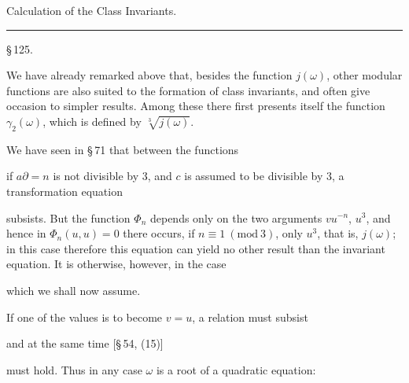 
\begin{center}

\vspace{1em}
{\Large Calculation of the Class Invariants.}

\vspace{0.5em}
\rule{2cm}{0.4pt}

\vspace{1em}
\S\,125. 
\end{center}

We have already remarked above that, besides the function $j(\omega)$,
other modular functions are also suited to the formation of class
invariants, and often give occasion to simpler results. Among these
there first presents itself the function $\gamma_2(\omega)$, which is
defined by $\sqrt[3]{j(\omega)}$. %

We have seen in \S\,71 that between the functions


if $a\partial = n$ is not divisible by 3, and $c$ is assumed to be
divisible by 3, a transformation equation


subsists. But the function $\Phi_n$ depends only on the two arguments
$vu^{-n}$, $u^3$, and hence in $\Phi_n(u, u) = 0$ there occurs, if
$n \equiv 1\ (\mathrm{mod}\ 3)$, only $u^3$, that is, $j(\omega)$; in
this case therefore this equation can yield no other result than the
invariant equation. It is otherwise, however, in the case


which we shall now assume.

If one of the values is to become $v = u$, a relation must subsist


and at the same time [\S\,54, (15)]


must hold. Thus in any case $\omega$ is a root of a quadratic
equation:

